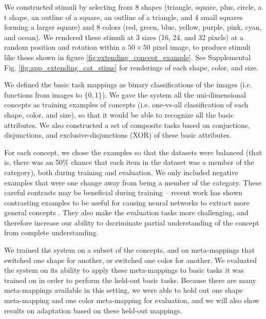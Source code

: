 We constructed stimuli by selecting from 8 shapes (triangle, square, plus, circle, a t shape, an outline of a square, an outline of a triangle, and 4 small squares forming a larger square) and 8 colors (red, green, blue, yellow, purple, pink, cyan, and ocean). We rendered these stimuli at 3 sizes (16, 24, and 32 pixels) at a random position and rotation within a \(50 \times 50\) pixel image, to produce stimuli like those shown in figure \ref{fig:extending_concept_example}. See Supplemental Fig. \ref{fig:app_extending_cat_stims} for renderings of each shape, color, and size. \par
We defined the basic task mappings as binary classifications of the images (i.e. functions from images to \(\{0, 1\}\)). We gave the system all the uni-dimensional concepts as training examples of concepts (i.e. one-vs-all classification of each shape, color, and size), so that it would be able to recognize all the basic attributes. We also constructed a set of composite tasks based on conjuctions, disjunctions, and exclusive-disjunctions (XOR) of these basic attributes. \par
For each concept, we chose the examples so that the datasets were balanced (that is, there was an 50\% chance that each item in the dataset was a member of the category), both during training and evaluation. We only included negative examples that were one change away from being a member of the category. These careful contrasts may be beneficial during training -- recent work has shown contrasting examples to be useful for causing neural networks to extract more general concepts \citep{Hill2019}. They also make the evaluation tasks more challenging, and therefore increase our ability to dscriminate partial understanding of the concept from complete understanding. \par
We trained the system on a subset of the concepts, and on meta-mappings that switched one shape for another, or switched one color for another. We evaluated the system on its ability to apply these meta-mappings to basic tasks it was trained on in order to perform the held-out basic tasks. Because there are many meta-mappings available in this setting, we were able to hold out one shape meta-mapping and one color meta-mapping for evaluation, and we will also show results on adaptation based on these held-out mappings. \par  

